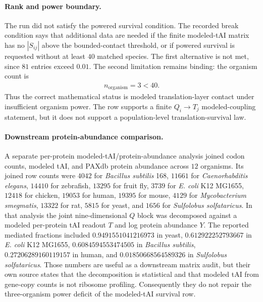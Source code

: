 \paragraph{Rank and power boundary.}
The run did not satisfy the powered survival condition.  The recorded break condition says that additional data are needed if the finite modeled-tAI matrix has no $|S_{ij}|$ above the bounded-contact threshold, or if powered survival is requested without at least $40$ matched species.  The first alternative is not met, since $81$ entries exceed $0.01$.  The second limitation remains binding: the organism count is
$$
\begin{aligned}
n_{\mathrm{organism}} = 3 < 40.
\end{aligned}
$$
Thus the correct mathematical status is modeled translation-layer contact under insufficient organism power.  The row supports a finite $Q_i \to T_j$ modeled-coupling statement, but it does not support a population-level translation-survival law.

\paragraph{Downstream protein-abundance comparison.}
A separate per-protein modeled-tAI/protein-abundance analysis joined codon counts, modeled tAI, and PAXdb protein abundance across $12$ organisms.  Its joined row counts were $4042$ for \textit{Bacillus subtilis} 168, $11661$ for \textit{Caenorhabditis elegans}, $14410$ for zebrafish, $13295$ for fruit fly, $3739$ for \textit{E. coli} K12 MG1655, $12418$ for chicken, $19053$ for human, $19395$ for mouse, $4129$ for \textit{Mycobacterium smegmatis}, $13322$ for rat, $5815$ for yeast, and $1656$ for \textit{Sulfolobus solfataricus}.  In that analysis the joint nine-dimensional $Q$ block was decomposed against a modeled per-protein tAI readout $T$ and log protein abundance $Y$.  The reported mediated fractions included $0.9491551041216973$ in yeast, $0.612922252793667$ in \textit{E. coli} K12 MG1655, $0.6084594553474505$ in \textit{Bacillus subtilis}, $0.27206289160119157$ in human, and $0.01850668564589326$ in \textit{Sulfolobus solfataricus}.  Those numbers are useful as a downstream matrix audit, but their own source states that the decomposition is statistical and that modeled tAI from gene-copy counts is not ribosome profiling.  Consequently they do not repair the three-organism power deficit of the modeled-tAI survival row.

